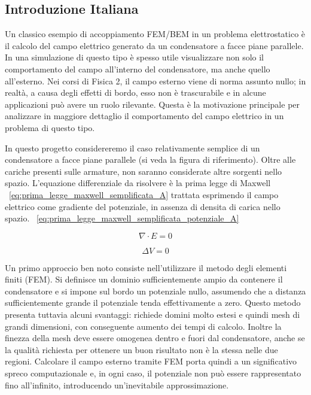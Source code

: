 \documentclass[11pt,onecolumn]{article}
\begin{document}
\begin{appendices}
\section{Introduzione Italiana}

Un classico esempio di accoppiamento FEM/BEM in un problema elettrostatico è il calcolo del campo elettrico generato da un condensatore a facce piane parallele. In una simulazione di questo tipo è spesso utile visualizzare non solo il comportamento del campo all’interno del condensatore, ma anche quello all’esterno. Nei corsi di Fisica 2, il campo esterno viene di norma assunto nullo; in realtà, a causa degli effetti di bordo, esso non è trascurabile e in alcune applicazioni può avere un ruolo rilevante. Questa è la motivazione principale per analizzare in maggiore dettaglio il comportamento del campo elettrico in un problema di questo tipo.

In questo progetto considereremo il caso relativamente semplice di un condensatore a facce piane parallele (si veda la figura di riferimento). Oltre alle cariche presenti sulle armature, non saranno considerate altre sorgenti nello spazio. L’equazione differenziale da risolvere è la prima legge di Maxwell ~\eqref{eq:prima_legge_maxwell_semplificata_A} trattata esprimendo il campo elettrico come gradiente del potenziale, in assenza di densita di carica nello spazio. ~\eqref{eq:prima_legge_maxwell_semplificata_potenziale_A}

\begin{equation}
	\nabla \cdot E = 0
\label{eq:prima_legge_maxwell_semplificata_A}
\end{equation}

\begin{equation}
	\Delta V = 0
\label{eq:prima_legge_maxwell_semplificata_potenziale_A}
\end{equation}

Un primo approccio ben noto consiste nell’utilizzare il metodo degli elementi finiti (FEM). Si definisce un dominio sufficientemente ampio da contenere il condensatore e si impone sul bordo un potenziale nullo, assumendo che a distanza sufficientemente grande il potenziale tenda effettivamente a zero. Questo metodo presenta tuttavia alcuni svantaggi: richiede domini molto estesi e quindi mesh di grandi dimensioni, con conseguente aumento dei tempi di calcolo. Inoltre la finezza della mesh deve essere omogenea dentro e fuori dal condensatore, anche se la qualità richiesta per ottenere un buon risultato non è la stessa nelle due regioni. Calcolare il campo esterno tramite FEM porta quindi a un significativo spreco computazionale e, in ogni caso, il potenziale non può essere rappresentato fino all’infinito, introducendo un’inevitabile approssimazione.


\end{appendices}
\end{document}
